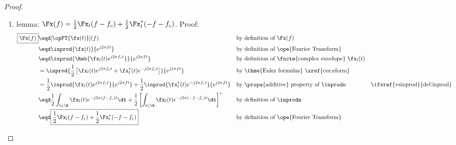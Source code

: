 \begin{proof}
\begin{enumerate}
  \item lemma: $\Fx(f)=\frac{1}{2}\Fx_l(f-f_c) + \frac{1}{2}\Fx_l^\ast(-f-f_c)$. Proof: \label{ilem:xxl}
    \begin{align*}
      \boxed{\Fx(f)}
           &\eqd [\opFT{\fx(t)}](f)
           && \text{by definition of $\Fx(f)$}
         \\&\eqd \inprod{\fx(t)}{e^{j2\pi ft}}
           && \text{by definition of \ope{Fourier Transform}}
         \\&\eqd \inprod{\Reb{ \fx_l(t)e^{j2\pi f_ct}}}
                              {e^{j2\pi ft}}
           && \text{by definition of \fncte{complex envelope} $\fx_l(t)$}
         \\&=    \inprod{\frac{1}{2}\left[ \fx_l(t)e^{j2\pi f_ct} + \fx_l^\ast(t)e^{-j2\pi f_ct}   \right]}
                              {e^{j2\pi ft}}
            && \text{by \thme{Euler formulas}
                     \xref{cor:eform}}
         \\&=    \frac{1}{2} \inprod{\fx_l(t)     e^{ j2\pi f_ct}}{ e^{j2\pi ft}}
               + \frac{1}{2} \inprod{\fx_l^\ast(t)e^{-j2\pi f_ct}}{ e^{j2\pi ft}}
           && \text{by \prope{additive} property of $\inprodn$}
           && \text{\ifxref{vsinprod}{def:inprod}}
         \\&\eqd \frac{1}{2} \int_{t\in\R}  \fx_l(t)e^{-j2\pi(f-f_c)t} \dt
            +    \frac{1}{2} \left[ \int_{t\in\R}  \fx_l(t) e^{-j2\pi(- f-f_c)t}  \dt \right]^\ast
           && \text{by definition of $\inprodn$}
         \\&\eqd \boxed{\frac{1}{2}\Fx_l(f-f_c) + \frac{1}{2}\Fx_l^\ast(-f-f_c)}
           && \text{by definition of \ope{Fourier Transform}}
    \end{align*}


\end{enumerate}
\end{proof}

